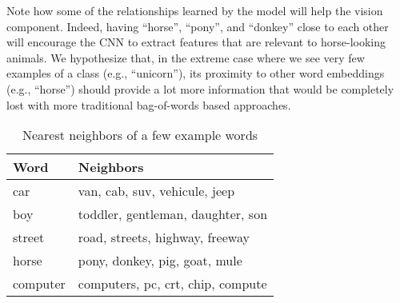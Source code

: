 Note how some of the relationships
learned by the model will help the vision component. Indeed, having ``horse'', ``pony'',
and ``donkey'' close to each other will encourage the CNN to extract features that
are relevant to horse-looking animals.
We hypothesize that, in the extreme case where we see very few examples of a class (e.g., ``unicorn''),
its proximity to other word embeddings (e.g., ``horse'') should
provide a lot more information that would be completely lost with more
traditional bag-of-words based approaches.


\begin{table}[htb]
\label{tab:embeddings}
\begin{center}
\begin{tabular}{|l|l|}\hline
Word & Neighbors \\ \hline
car & van, cab, suv, vehicule, jeep \\
boy & toddler, gentleman, daughter, son \\
street & road, streets, highway, freeway \\
horse & pony, donkey, pig, goat, mule \\
computer & computers, pc, crt, chip, compute \\ \hline
\end{tabular}
\end{center}
\caption{{Nearest neighbors of a few example words}}
\end{table}


